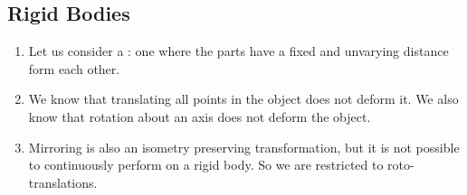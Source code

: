\subsection{Rigid Bodies}

\begin{enumerate}
  \item Let us consider a : one where the parts have
  a fixed and unvarying distance form each other.

  \item We know that translating all points in the object does not
  deform it. We also know that rotation about an axis does not deform
  the object.

  \item Mirroring is also an isometry preserving transformation, but it
  is not possible to continuously perform on a rigid body. So we are
  restricted to roto-translations.
\end{enumerate}
